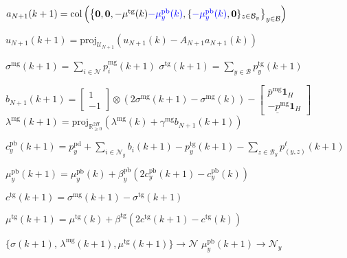 \documentclass[10pt]{article}
\newtheorem{definitiox	n}{Definition}{\it}{}
\newcommand{\mc}{\mathcal}
\newcommand{\bb}{\mathbb}
\newcommand{\R}{\bb R}
\newcommand{\red}{\textcolor{red}}
\newcommand{\blue}{\textcolor{blue}}
\newcommand{\proj}{\mathrm{proj}}
\newcommand{\col}{\operatorname{col}}
\newcommand{\0}{\mathbf{0}}
\newcommand{\1}{\mathbf{1}}
\begin{document}
\begin{algorithm}[H]
\begin{algorithmic}[1]
\EndDual

\EndFor

\DSO{ }

\Primal{}
\State
$a_{N+1}(k+1) = \col \left( 
	\left\{
	\0,\0,-\mu^{\text{tg}}(k) \blue{- \mu_y^{\text{pb}}(k)}, 
	\{ \blue{-\mu_y^{\text{pb}}(k)}, \0 \}_{z \in \mc B_y}
	\right\}_{y \in \mc B}
	\right)$

\State 	$u_{N+1}(k+1) = \proj_{\mc U_{N+1}}  \left( u_{N+1}(k) - A_{N+1} a_{N+1}(k) \right)$
\Comment{\red{solved via Algorithm 2}}
\EndPrimal

\Agg{}
\State
$ \sigma^{\text{mg}}(k+1) = \sum_{i \in \mc N} p_i^{\text{mg}}(k+1) $
\State
$\sigma^{\text{tg}}(k+1) = \sum_{y \in \mc B} p_y^{\text{tg}}(k+1)$
\EndAgg

\Dual{}
\State
$b_{N+1}(k+1	) = 
	\left[
	\begin{smallmatrix}
	1\\
	- 1 
	\end{smallmatrix}
	\right] \otimes (2 \sigma^{\text{mg}}(k+1)- \sigma^{\text{mg}}(k)) 
	-
	\left[
	\begin{smallmatrix}
	\overline{p}^{\mathrm{mg}}\1_{H} \\
	-     \underline{p}^{\mathrm{mg}} \1_{H}
	\end{smallmatrix} 
	\right]  $
	\State
$\lambda^{\text{mg}}(k+1) = \textstyle
	\proj_{\R^{2 H}_{\geq 0}}\left( 
	\lambda^{\text{mg}}(k) + \gamma^{\text{mg}} b_{N+1}(k+1)
	 \right)$

\ForAll{buses $ y \in \mc B$}

\State
$c^{\text{pb}}_y(k+1)   = p_y^{\text{pd}} + \sum_{i \in \mc N_y} b_i(k+1)- p^{\text{tg}}_y(k+1) - \sum_{z \in \mc B_y} p^\ell_{(y,z)} (k+1)$

\State
$\mu_y^{\text{pb}}(k+1) = \mu_y^{\text{pb}}(k) + \beta^{\text{pb}}_y (2 c^{\text{pb}}_y(k+1)- c^{\text{pb}}_y(k))$
\EndFor

\State
$c^{\text{tg}}(k+1) = \sigma^{\text{mg}}
	(k+1)- \sigma^{\text{tg}}(k+1)$

\State
$\mu^{\text{tg}}(k+1) = \mu^{\text{tg}}(k) + \beta^{\text{tg}} (2c^{\text{tg}}(k+1)-c^{\text{tg}}(k))$
\EndDual	

\Comm{ }
\State
$ \{ \sigma(k+1), \, \lambda^{\text{mg}}(k+1), \mu^{\text{tg}}(k+1) \} 
	\longrightarrow  \mc N$
\ForAll{buses $ y \in \mc B$}
\State
$\mu^{\text{pb}}_y(k+1)\longrightarrow \mc N_y$
\EndFor

\EndComm

\EndDSO	

\EndIUC	

\end{algorithmic}
\end{algorithm}
\end{document}
